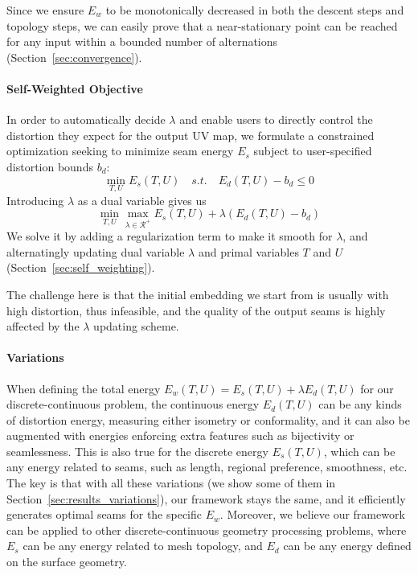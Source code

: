 Since we ensure $E_w$ to be monotonically decreased in both the descent steps and topology steps, we can easily prove that a near-stationary point can be reached for any input within a bounded number of alternations (Section~\ref{sec:convergence}).

\paragraph{Self-Weighted Objective}

In order to automatically decide $\lambda$ and enable users to directly control the distortion they expect for the output UV map, we formulate a constrained optimization seeking to minimize seam energy $E_s$ subject to user-specified distortion bounds $b_d$:
\[ \min_{T,U} E_s(T,U) \quad s.t. \quad E_d(T,U) - b_d \leq 0 \]
Introducing $\lambda$ as a dual variable gives us
\[ \min_{T,U} \max_{\lambda \in \mathcal{R^+}} E_s(T,U) + \lambda(E_d(T,U) - b_d) \]
We solve it by adding a regularization term to make it smooth for $\lambda$, and alternatingly updating dual variable $\lambda$ and primal variables $T$ and $U$ (Section~\ref{sec:self_weighting}).

The challenge here is that the initial embedding we start from is usually with high distortion, thus infeasible, and the quality of the output seams is highly affected by the $\lambda$ updating scheme. 
 
\paragraph{Variations}

When defining the total energy $E_w(T,U) = E_s(T,U) + \lambda E_d(T,U)$ for our discrete-continuous problem, the continuous energy $E_d(T,U)$ can be any kinds of distortion energy, measuring either isometry or conformality, and it can also be augmented with energies enforcing extra features such as bijectivity or seamlessness. This is also true for the discrete energy $E_s(T,U)$, which can be any energy related to seams, such as length, regional preference, smoothness, etc. The key is that with all these variations (we show some of them in Section~\ref{sec:results_variations}), our framework stays the same, and it efficiently generates optimal seams for the specific $E_w$. Moreover, we believe our framework can be applied to other discrete-continuous geometry processing problems, where $E_s$ can be any energy related to mesh topology, and $E_d$ can be any energy defined on the surface geometry.
